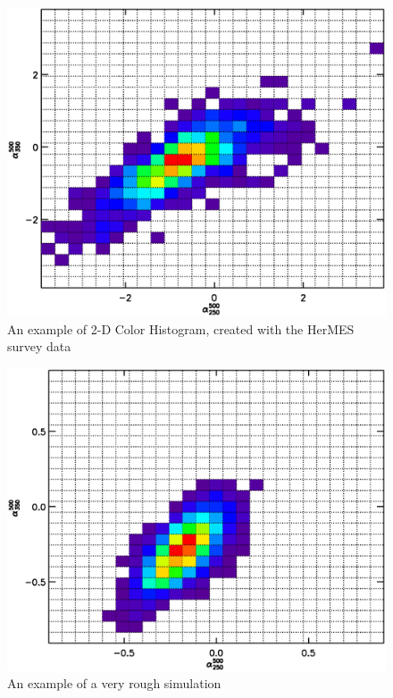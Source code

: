 \documentclass[twocolumn,letterpaper,10pt]{article}
\begin{document}
\begin{figure}
  \includegraphics[width=\textwidth]{obs_color_hist.eps}
  \caption{An example of 2-D Color Histogram, created with the HerMES survey data}
  \label{fig:hist1}
\end{figure}

\begin{figure}
\includegraphics[width=\textwidth]{model_color_hist.eps}
\caption{An example of a very rough simulation}
\label{simmed}
\end{figure}

\end{document}
